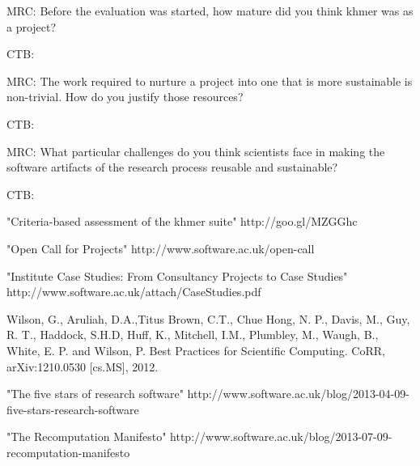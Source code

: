 \documentclass{article}
\begin{document}

MRC: Before the evaluation was started, how mature did you think khmer was as a
project?

CTB: 

MRC: The work required to nurture a project into one that is more sustainable is
non-trivial. How do you justify those resources?

CTB:

MRC: What particular challenges do you think scientists face in making the
software artifacts of the research process reusable and sustainable?

CTB:





"Criteria-based assessment of the khmer suite" http://goo.gl/MZGGhc 

"Open Call for Projects" http://www.software.ac.uk/open-call

"Institute Case Studies: From Consultancy Projects to Case Studies" http://www.software.ac.uk/attach/CaseStudies.pdf

Wilson, G., Aruliah, D.A.,Titus Brown, C.T., Chue Hong, N. P., Davis, M., Guy, R. T.,
Haddock, S.H.D, Huff, K., Mitchell, I.M., Plumbley, M., Waugh, B., White, E. P.
and Wilson, P. Best Practices for Scientific Computing. CoRR, arXiv:1210.0530
[cs.MS], 2012.

"The five stars of research software" http://www.software.ac.uk/blog/2013-04-09-five-stars-research-software

"The Recomputation Manifesto" http://www.software.ac.uk/blog/2013-07-09-recomputation-manifesto
\end{document}
